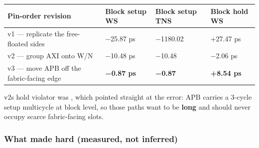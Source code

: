 \begin{record}
{
\begin{longtable}[]{@{}
  >{\raggedright\arraybackslash}p{}
  >{\raggedright\arraybackslash}p{}
  >{\raggedright\arraybackslash}p{}
  >{\raggedright\arraybackslash}p{}@{}}
\toprule\noalign{}
\begin{minipage}[b]{\linewidth}\raggedright
Pin-order revision
\end{minipage} & \begin{minipage}[b]{\linewidth}\raggedright
Block setup WS
\end{minipage} & \begin{minipage}[b]{\linewidth}\raggedright
Block setup TNS
\end{minipage} & \begin{minipage}[b]{\linewidth}\raggedright
Block hold WS
\end{minipage} \\
\midrule\noalign{}
\endhead
\bottomrule\noalign{}
\endlastfoot
v1 --- replicate the free-floated sides & −25.87 ps & −1180.02 & +27.47
ps \\
v2 --- group AXI onto W/N & −10.48 ps & −10.48 & −2.06 ps \\
v3 --- move APB off the fabric-facing edge & \textbf{−0.87 ps} &
\textbf{−0.87} & \textbf{+8.54 ps} \\
\end{longtable}
}

v2\textquotesingle s hold violator was , which
pointed straight at the error: APB carries a 3-cycle setup multicycle at
block level, so those paths want to be \textbf{long} and should never
occupy scarce fabric-facing slots.

\end{record}

\subsubsection{\texorpdfstring{What made  hard (measured,
not inferred)}{What made  hard (measured, not inferred)}}\label{cr:run:phase5:what-made-cpu-clk-hard-measured-not-inferred}


